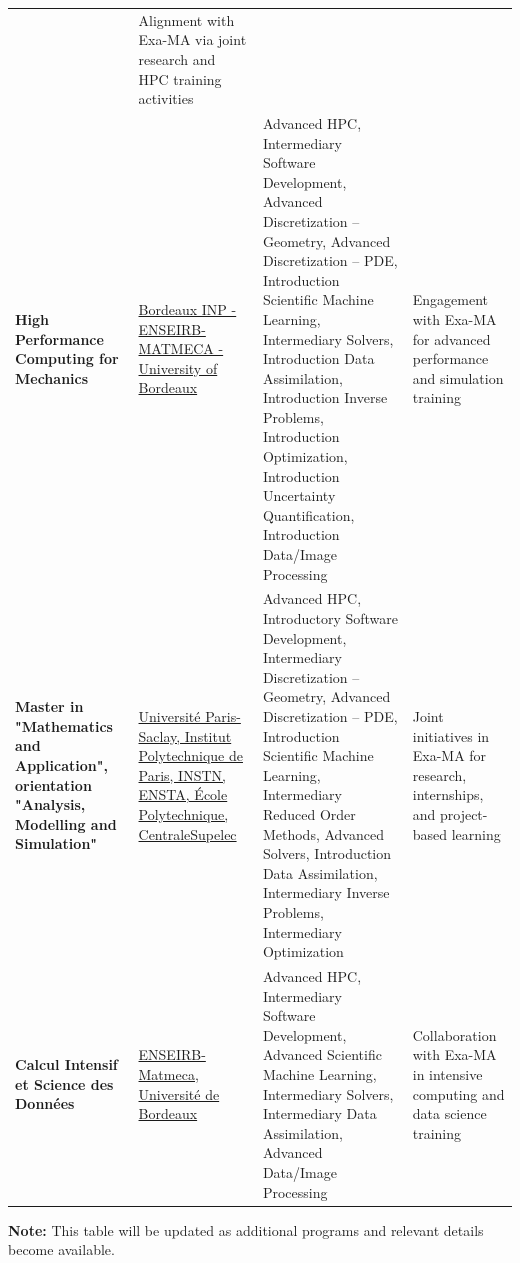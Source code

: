 \begin{landscape}
\begin{xltabular}{\linewidth}{X X X X}
    & Alignment with Exa-MA via joint research and HPC training activities \\
  \textbf{High Performance Computing for Mechanics}
    & \href{https://formation.bordeaux-inp.fr/fr/offre-de-formation/titre-d-ingenieur-DING/ingenieur-specialite-mathematiques-et-mecanique-LUMF0006/semestre-9-calcul-haute-performance-pour-la-mecanique-LUME2197.html}{Bordeaux INP - ENSEIRB-MATMECA - University of Bordeaux}
    & Advanced HPC, Intermediary Software Development, Advanced Discretization – Geometry, Advanced Discretization – PDE, Introduction Scientific Machine Learning, Intermediary Solvers, Introduction Data Assimilation, Introduction Inverse Problems, Introduction Optimization, Introduction Uncertainty Quantification, Introduction Data/Image Processing
    & Engagement with Exa-MA for advanced performance and simulation training \\
  \textbf{Master in "Mathematics and Application", orientation "Analysis, Modelling and Simulation"}
    & \href{https://uma.ip-paris.fr/enseignement/master-ams}{Universit\'e Paris-Saclay, Institut Polytechnique de Paris, INSTN, ENSTA, École Polytechnique, CentraleSupelec}
    & Advanced HPC, Introductory Software Development, Intermediary Discretization – Geometry, Advanced Discretization – PDE, Introduction Scientific Machine Learning, Intermediary Reduced Order Methods, Advanced Solvers, Introduction Data Assimilation, Intermediary Inverse Problems, Intermediary Optimization
    & Joint initiatives in Exa-MA for research, internships, and project-based learning \\
  \textbf{Calcul Intensif et Science des Données}
    & \href{https://cisd.enseirb-matmeca.fr/}{ENSEIRB-Matmeca, Université de Bordeaux}
    & Advanced HPC, Intermediary Software Development, Advanced Scientific Machine Learning, Intermediary Solvers, Intermediary Data Assimilation, Advanced Data/Image Processing
    & Collaboration with Exa-MA in intensive computing and data science training \\
  \bottomrule

\end{xltabular}
\end{landscape}

\vspace{1em}
\noindent \textbf{Note:} This table will be updated as additional programs and relevant details become available.

